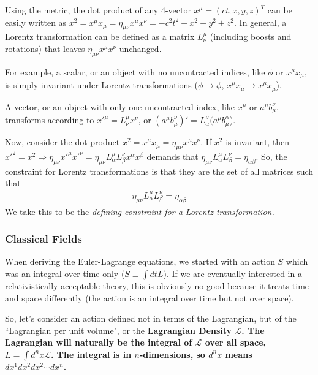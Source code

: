 \documentclass[12pt,epsf]{article}
\def\nolabel{\nonumber }
\def\nolabel{\nonumber }
\begin{document}
Using the metric, the dot product of any 4-vector $x^{\mu} = (ct,
x,y,z)^T$ can be easily written as $x^2 = x^{\mu}x_{\mu} = \eta_{\mu
\nu} x^{\mu} x^{\nu} = -c^2t^2 + x^2+y^2+z^2$.	In general, a Lorentz
transformation can be defined as a matrix $L^{\mu}_{\nu}$ (including
boosts and rotations) that leaves $\eta_{\mu \nu}x^{\mu}x^{\nu}$ 
unchanged.  

For example, a scalar, or an object with no uncontracted indices, like
$\phi$ or $x^{\mu}x_{\mu}$, is simply invariant under Lorentz
transformations ($\phi \rightarrow \phi$, $x^{\mu}x_{\mu} \rightarrow
x^{\mu}x_{\mu}$).  

A vector, or an object with only one uncontracted index, like $x^{\mu}$
or $a^{\mu}b_{\mu}^{\nu}$, transforms according to $x'^{\mu} =
L^{\mu}_{\nu}x^{\nu}$, or $(a^{\mu}b^{\nu}_{\mu})' =
L^{\nu}_{\alpha}(a^{\mu}b^{\alpha}_{\mu}$).  

Now, consider the dot product $x^2 = x^{\mu}x_{\mu} = \eta_{\mu
\nu}x^{\mu}x^{\nu}$.  If $x^2$ is invariant, then $x'^2 = x^2
\Rightarrow \eta_{\mu \nu}x'^{\mu}x'^{\nu} = \eta_{\mu
\nu}L^{\mu}_{\alpha}L^{\nu}_{\beta}x^{\alpha}x^{\beta}$ demands that
$\eta_{\mu \nu}L^{\mu}_{\alpha}L^{\nu}_{\beta} = \eta_{\alpha \beta}$. 
So, the constraint for Lorentz transformations is that they are the set
of all matrices such that 
\begin{eqnarray}
\eta_{\mu \nu}L^{\mu}_{\alpha}L^{\nu}_{\beta} = \eta_{\alpha \beta}
\nolabel 
\end{eqnarray}
We take this to be the \it defining \rm constraint for a Lorentz
transformation.  

\subsubsection{Classical Fields}
\label{sec:classical}

When deriving the Euler-Lagrange equations, we started with an action
$S$ which was an integral over time only ($S \equiv \int dt L$).  If we
are eventually interested in a relativistically acceptable theory, this
is obviously no good because it treats time and space differently (the
action is an integral over time but not over space).  

So, let's consider an action defined not in terms of the Lagrangian,
but of the ``Lagrangian per unit volume", or the \bf Lagrangian Density
\rm $\mathcal{L}$.  The Lagrangian will naturally be the integral of
$\mathcal{L}$ over all space, $L = \int d^nx \mathcal{L}$.  The integral
is in $n$-dimensions, so $d^nx$ means $dx^1dx^2dx^2\cdots dx^n$.  
\end{document}
